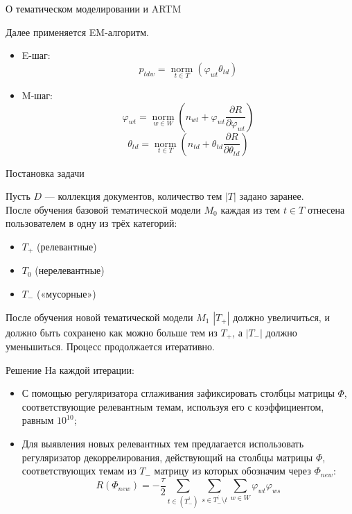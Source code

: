 \documentclass{beamer}
\DeclareMathOperator*{\norm}{\text{norm}}
\begin{document}
\begin{frame}{О тематическом моделировании и ARTM}

Далее применяется EM-алгоритм.

\begin{itemize}
    \item E-шаг:
    $$p_{tdw} = \norm \limits_{t \in T} (\varphi_{wt} \theta_{td})$$
    \item M-шаг: 
    $$
    \varphi_{wt} = \norm \limits_{w \in W} (n_{wt} + \varphi_{wt} \frac{\partial R}{\partial \varphi_{wt}})
    $$
    $$
    \theta_{td} = \norm \limits_{t \in T} (n_{td} + \theta_{td} \frac{\partial R}{\partial \theta_{td}})
    $$
\end{itemize}

\end{frame}
\begin{frame}{Постановка задачи}

Пусть $D$ — коллекция документов, количество тем $|T|$ задано заранее. \\
После обучения базовой тематической модели $M_0$ каждая из тем $t \in T$ отнесена пользователем в одну из трёх категорий:
\begin{itemize}
    \item $T_+$ (релевантные)
    \item $T_0$ (нерелевантные)
    \item $T_-$ («мусорные»)
\end{itemize}
После обучения новой тематической модели $M_1$ $|T_+|$ должно увеличиться, и должно быть сохранено как можно больше тем из $T_+$, а $|T_-|$ должно уменьшиться. Процесс продолжается итеративно.

\end{frame}
\begin{frame}{Решение}
На каждой итерации:
\begin{itemize}
    \item С помощью регуляризатора сглаживания зафиксировать столбцы матрицы $\Phi$, соответствующие релевантным темам, используя его с коэффициентом, равным ${10}^{10}$;
    \item Для выявления новых релевантных тем предлагается использовать регуляризатор декоррелирования, действующий на столбцы матрицы $\Phi$, соответствующих темам из $T_-$ матрицу из которых обозначим через $\Phi_{new}$:
        $$R (\Phi_{new}) = -\frac{\tau}{2} \sum \limits_{t \in (T_-^i)} \sum \limits_{s \in T_-^i \setminus t} \sum \limits_{w \in W} \varphi_{wt} \varphi_{ws}$$
\end{itemize}
\end{frame}
\end{document}
